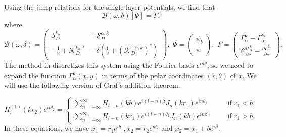\documentclass[a4paper]{article}
\theoremstyle{definition}
\newcommand{\B}{\mathcal{B}}
\renewcommand{\S}{\mathcal{S}}
\newcommand{\K}{\mathcal{K}}
\begin{document}
Using the jump relations for the single layer potentials, we find that
\begin{equation*}
\B(\omega,\delta)[\Psi] = F,
\end{equation*}
where 
\begin{equation*}
\B(\omega, \delta) = 
\begin{pmatrix}
\S_D^{k_b} &  -\S_D^{\alpha,k}  \\
-\frac{1}{2}+ \K_D^{k_b, *}& -\delta( \frac{1}{2}+ (\K_D^{ -\alpha,k})^*)
\end{pmatrix}, 
\,\, \Psi= 
\begin{pmatrix}
\psi_b\\
\psi
\end{pmatrix},
\,\, F=
\begin{pmatrix}
\Gamma_\alpha^{k} - \Gamma_\alpha^{k_b} \\
\delta\frac{\partial \Gamma_\alpha^{k}}{\partial \nu} -
\frac{\partial \Gamma_\alpha^{k_b}}{\partial \nu} 
\end{pmatrix}.
\end{equation*}
The method in \cite{bandgap} discretizes this system using the Fourier basis $e^{in\theta}$, so  we need to expand the function $\Gamma_\alpha^k(x,y)$ in terms of the polar coordinates $(r,\theta)$ of $x$. We will use the following version of Graf's addition theorem.

\begin{equation*}
H_l^{(1)}(kr_2)e^{il\theta_2} =
\begin{cases}
\sum_{n=-\infty}^\infty H_{l-n}(kb)e^{i(l-n)\beta}J_n(kr_1)e^{in\theta_1} \qquad &\text{if } r_1<b, \\
\sum_{n=-\infty}^\infty H_{l-n}(kr_1)e^{i(l-n)\theta_1}J_n(kb)e^{in\beta} \qquad &\text{if } r_1>b.
\end{cases}
\end{equation*}
In these equations, we have $x_1 = r_1e^{i\theta_1}, x_2 = r_2e^{i\theta_2}$ and $x_2 = x_1 + be^{i\beta}$. 
\end{document}
